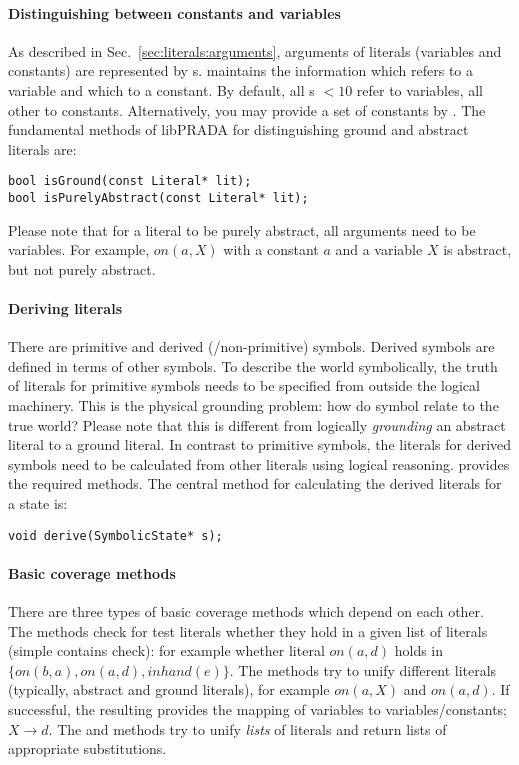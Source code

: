 \documentclass[10pt,twoside,twocolumn,fleqn]{article}
\begin{document}
\paragraph{Distinguishing between constants and variables}

As described in Sec.~\ref{sec:literals:arguments}, arguments of literals
(variables and constants) are represented by s. 
maintains the information which  refers to a variable and which
to a constant. By default, all s $<10$ refer to variables, all
other to constants. Alternatively, you may provide a set of constants by
. The fundamental methods of
libPRADA for distinguishing ground and abstract literals are:
\begin{lstlisting}
bool isGround(const Literal* lit);
bool isPurelyAbstract(const Literal* lit);
\end{lstlisting}
Please note that for a literal to be purely abstract, all arguments need
to be variables. For example, $on(a,X)$ with a constant $a$ and a variable
$X$ is abstract, but not purely abstract.

\paragraph{Deriving literals}

There are primitive and derived (/non-primitive) symbols. Derived symbols
are defined in terms of other symbols. To describe the world symbolically,
the truth of literals for primitive symbols needs to be specified from
outside the logical machinery. This is the physical grounding problem: how
do symbol relate to the true world? Please note that this is different from
logically \emph{grounding} an abstract literal to a ground literal.
In contrast to primitive symbols, the literals for derived symbols need to
be calculated from other literals using logical reasoning. 
provides the required methods. The central method for calculating the
derived literals for a state is:
\begin{lstlisting}
void derive(SymbolicState* s);
\end{lstlisting}


\paragraph{Basic coverage methods}

There are three types of basic coverage methods which depend on each
other. The  methods check for test literals whether they hold
in a given list of literals (simple contains check): for example whether
literal $on(a,d)$ holds in $\{on(b,a), on(a,d), inhand(e)\}$.  The
 methods try to unify different literals (typically,
abstract and ground literals), for example $on(a,X)$ and $on(a,d)$. If
successful, the resulting  provides the mapping of
variables to variables/constants; $X \to d$. The 
and  methods try to unify \emph{lists} of literals and return
lists of appropriate substitutions.
\end{document}
